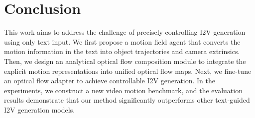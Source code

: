 \section{Conclusion}
\label{sec:conclusion}
This work aims to address the challenge of precisely controlling I2V generation using only text input. We first propose a motion field agent that converts the motion information in the text into object trajectories and camera extrinsics. Then, we design an analytical optical flow composition module to integrate the explicit motion representations into unified optical flow maps. Next, we fine-tune an optical flow adapter to achieve controllable I2V generation. In the experiments, we construct a new video motion benchmark, and the evaluation results demonstrate that our method significantly outperforms other text-guided I2V generation models.

